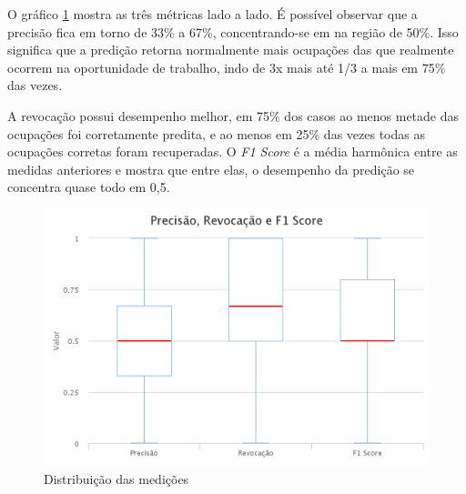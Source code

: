 \documentclass[runningheads,a4paper]{llncs}
\begin{document}
O gráfico \ref{fig:medicoes} mostra as três métricas lado a lado. É possível observar que a precisão fica em torno de 33\% a 67\%, concentrando-se em na região de 50\%. Isso significa que a predição retorna normalmente mais ocupações das que realmente ocorrem na oportunidade de trabalho, indo de 3x mais até 1/3 a mais em 75\% das vezes.

A revocação possui desempenho melhor, em 75\% dos casos ao menos metade das ocupações foi corretamente predita, e ao menos em 25\% das vezes todas as ocupações corretas foram recuperadas. O \textit{F1 Score} é a média harmônica entre as medidas anteriores e mostra que entre elas, o desempenho da predição se concentra quase todo em 0,5.

\begin{figure}
	\centering
	\includegraphics[scale=0.25]{medicoes2}
	\caption{Distribuição das medições}
	\label{fig:medicoes}
\end{figure}
\end{document}
